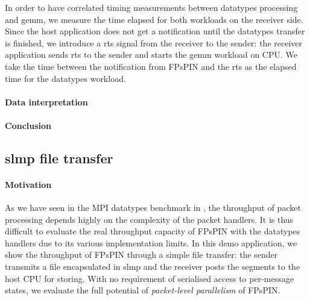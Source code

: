 In order to have correlated timing measurements between datatypes processing and \ac{gemm}, we measure the time elapsed for both workloads on the receiver side.  Since the host application does not get a notification until the datatypes transfer is finished, we introduce a \ac{rts} signal from the receiver to the sender: the receiver application sends \ac{rts} to the sender and starts the \ac{gemm} workload on CPU.  We take the time between the notification from FPsPIN and the \ac{rts} as the elapsed time for the datatypes workload.

\paragraph{Data interpretation}

\paragraph{Conclusion}



\subsection{\acs{slmp} file transfer}

\paragraph{Motivation} As we have seen in the MPI datatypes benchmark in , the throughput of packet processing depends highly on the complexity of the packet handlers.  It is thus difficult to evaluate the real throughput capacity of FPsPIN with the datatypes handlers due to its various implementation limits.  In this demo application, we show the throughput of FPsPIN through a simple file transfer: the sender transmits a file encapsulated in \ac{slmp} and the receiver posts the segments to the host CPU for storing.  With no requirement of serialised access to per-message states, we evaluate the full potential of \emph{packet-level parallelism} of FPsPIN.

